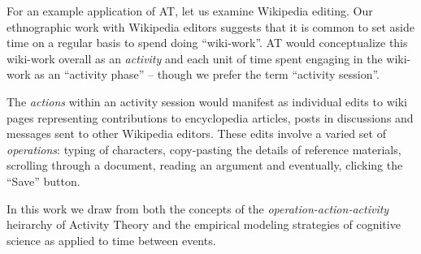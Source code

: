For an example application of AT, let us examine Wikipedia editing.  Our ethnographic work with Wikipedia editors suggests that it is common to set aside time on a regular basis to spend doing ``wiki-work''.  AT would conceptualize this wiki-work overall as an \emph{activity} and each unit of time spent engaging in the wiki-work as an ``activity phase'' -- though we prefer the term ``activity session''.

The \emph{actions} within an activity session would manifest as individual edits to wiki pages representing contributions to encyclopedia articles, posts in discussions and messages sent to other Wikipedia editors.  These edits involve a varied set of \emph{operations}: typing of characters, copy-pasting the details of reference materials, scrolling through a document, reading an argument and eventually, clicking the ``Save'' button.

In this work we draw from both the concepts of the \emph{operation-action-activity} heirarchy of Activity Theory and the empirical modeling strategies of cognitive science as applied to time between events.
